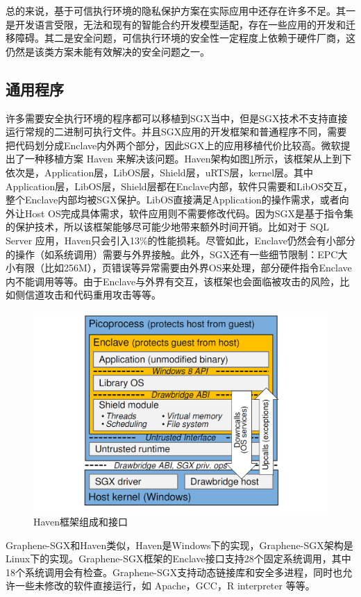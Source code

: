 \documentclass[twocolumn]{source/Paper}
\begin{document}
        总的来说，基于可信执行环境的隐私保护方案在实际应用中还存在许多不足。其一是开发语言受限，无法和现有的智能合约开发模型适配，存在一些应用的开发和迁移障碍。其二是安全问题，可信执行环境的安全性一定程度上依赖于硬件厂商，这仍然是该类方案未能有效解决的安全问题之一。

        \subsection{通用程序}

        许多需要安全执行环境的程序都可以移植到SGX当中，但是SGX技术不支持直接运行常规的二进制可执行文件。并且SGX应用的开发框架和普通程序不同，需要把代码划分成Enclave内外两个部分，因此SGX上的应用移植代价比较高。微软提出了一种移植方案 Haven\cite{baumann2015shielding} 来解决该问题。Haven架构如图\ref{haven}所示，该框架从上到下依次是，Application层，LibOS层，Shield层，uRTS层，kernel层。其中Application层，LibOS层，Shield层都在Enclave内部，软件只需要和LibOS交互，整个Enclave内部均被SGX保护。LibOS直接满足Application的操作需求，或者向外让Host OS完成具体需求，软件应用则不需要修改代码。因为SGX是基于指令集的保护技术，所以该框架能够尽可能少地带来额外时间开销。比如对于 SQL Server 应用，Haven只会引入13\%的性能损耗。尽管如此，Enclave仍然会有小部分的操作（如系统调用）需要与外界接触。此外，SGX还有一些细节限制：EPC大小有限（比如256M），页错误等异常需要由外界OS来处理，部分硬件指令Enclave内不能调用等等。由于Enclave与外界有交互，该框架也会面临被攻击的风险，比如侧信道攻击和代码重用攻击\cite{biondo2018guard}等等。

        \begin{figure}[H]
            \centering
            \includegraphics[width=0.7\linewidth]{pic/haven.png}
            \caption{Haven框架组成和接口}
            \label{haven}
        \end{figure}

        Graphene-SGX\cite{tsai2017graphene}和Haven类似，Haven是Windows下的实现，Graphene-SGX架构是Linux下的实现。Graphene-SGX框架的Enclave接口支持28个固定系统调用，其中18个系统调用会有检查。Graphene-SGX支持动态链接库和安全多进程，同时也允许一些未修改的软件直接运行，如 Apache，GCC，R interpreter 等等。
\end{document}
